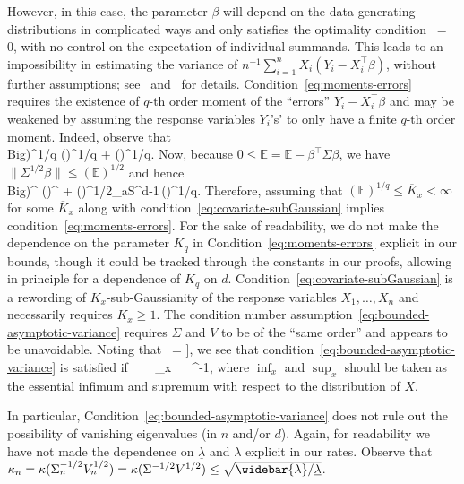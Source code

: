 \documentclass{article}
\begin{document}
  However, in this case, the parameter $\beta$ will depend on the data generating distributions in complicated ways and only satisfies the optimality condition
 \ = 0,
 \]
 with no control on the expectation of individual summands. This leads to an impossibility in estimating the variance of $n^{-1}\sum_{i=1}^n X_i(Y_i - X_i^{\top}\beta)$, without further assumptions; see~\cite{Liu95} and~\citet{Bac16} for details. Condition~\ref{eq:moments-errors} requires the existence of $q$-th order moment of the ``errors'' $Y_i - X_i^{\top}\beta$ and may be weakened by assuming the response variables $Y_i$'s' to only have a finite $q$-th order moment. Indeed, observe that
 \\Big)^{1/q} \le \left(\right)^{1/q} + \left(\right)^{1/q}.
 \]
 Now, because $0 \leq \mathbb{E} = \mathbb{E} - \beta^\top \Sigma \beta$, we have $\|\Sigma^{1/2}\beta\| \le (\mathbb{E})^{1/2}$ and hence
 \\Big)^{} \le \left(\right)^{} + ()^{1/2}\sup_{a\in S^{d-1}}\,\left(\right)^{1/q}.
 \]
 Therefore, assuming that $(\mathbb{E})^{1/q} \le \overline{K}_x < \infty$ for some $\overline{K}_x$ along with condition~\ref{eq:covariate-subGaussian} implies condition~\ref{eq:moments-errors}. For the sake of readability, we do not make the dependence on the parameter $K_q$ in Condition~\ref{eq:moments-errors} explicit in our bounds, though it could be tracked through the constants in our proofs, allowing in principle for a dependence of $K_q$ on $d$.
 Condition~\ref{eq:covariate-subGaussian} is a rewording of $K_x$-sub-Gaussianity of the response variables $X_1, \ldots, X_n$ and necessarily requires $K_x \ge 1$. The condition number assumption~\ref{eq:bounded-asymptotic-variance} requires $\Sigma$ and $V$ to be of the ``same order'' and appears to be unavoidable.  Noting that
 \ = \left\right],
 \]
 we see that condition~\ref{eq:bounded-asymptotic-variance} is satisfied if
 \ ~\le~ \sup_{x} ~\le~ \underline{\lambda}^{-1},
 \]
 where $\inf_x$ and $\sup_x$ should be taken as the essential infimum and supremum with respect to the distribution of $X$. 
 
 
 
 
 
 
 
 
 
 
 
 
 
 In particular, Condition~\ref{eq:bounded-asymptotic-variance} does not rule out the possibility of vanishing eigenvalues (in $n$ and/or $d$). Again, for readability we have not made the dependence on $\underline{\lambda}$ and $\overline{\lambda}$ explicit in our rates. Observe that $\kappa_n = \kappa(\Sigma_n^{-1/2}V_n^{1/2}) = \kappa(\Sigma^{-1/2}V^{1/2}) \le \sqrt{\widebar{\lambda}/\underline{\lambda}}$.
 
\end{document}
